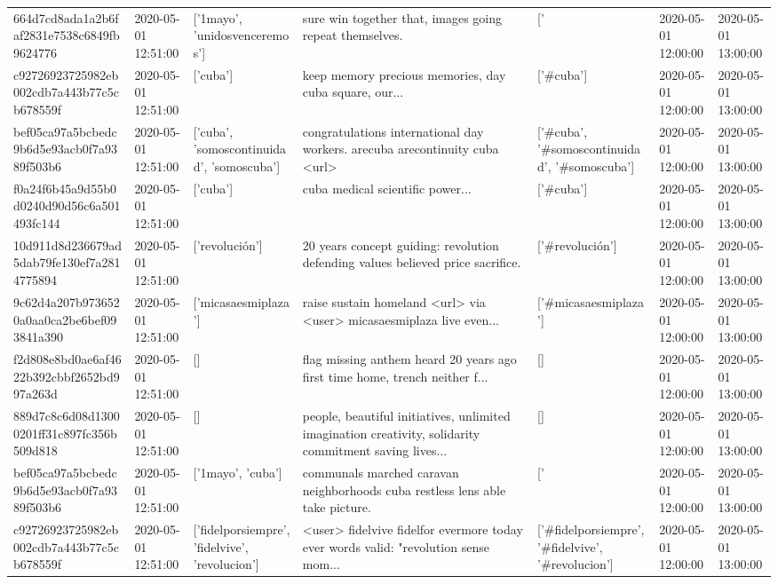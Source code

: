 \begin{tabular}{lllllll}
664d7cd8ada1a2b6faf2831e7538c6849fb9624776 & 2020-05-01 12:51:00 & ['1mayo', 'unidosvenceremos'] & sure win together that, images going repeat themselves. & ['#1mayo', '#unidosvenceremos'] & 2020-05-01 12:00:00 & 2020-05-01 13:00:00 \\
c92726923725982eb002cdb7a443b77c5cb678559f & 2020-05-01 12:51:00 & ['cuba'] & keep memory precious memories, day cuba square, our... & ['#cuba'] & 2020-05-01 12:00:00 & 2020-05-01 13:00:00 \\
bef05ca97a5bcbedc9b6d5e93acb0f7a9389f503b6 & 2020-05-01 12:51:00 & ['cuba', 'somoscontinuidad', 'somoscuba'] & congratulations international day workers. arecuba arecontinuity cuba <url> & ['#cuba', '#somoscontinuidad', '#somoscuba'] & 2020-05-01 12:00:00 & 2020-05-01 13:00:00 \\
f0a24f6b45a9d55b0d0240d90d56c6a501493fc144 & 2020-05-01 12:51:00 & ['cuba'] & cuba medical scientific power... & ['#cuba'] & 2020-05-01 12:00:00 & 2020-05-01 13:00:00 \\
10d911d8d236679ad5dab79fe130ef7a2814775894 & 2020-05-01 12:51:00 & ['revolución'] & 20 years concept guiding: revolution defending values believed price sacrifice. & ['#revolución'] & 2020-05-01 12:00:00 & 2020-05-01 13:00:00 \\
9c62d4a207b9736520a0aa0ca2be6bef093841a390 & 2020-05-01 12:51:00 & ['micasaesmiplaza'] & raise sustain homeland <url> via <user> micasaesmiplaza live even... & ['#micasaesmiplaza'] & 2020-05-01 12:00:00 & 2020-05-01 13:00:00 \\
f2d808e8bd0ae6af4622b392cbbf2652bd997a263d & 2020-05-01 12:51:00 & [] & flag missing anthem heard 20 years ago first time home, trench neither f... & [] & 2020-05-01 12:00:00 & 2020-05-01 13:00:00 \\
889d7c8c6d08d13000201ff31c897fc356b509d818 & 2020-05-01 12:51:00 & [] & people, beautiful initiatives, unlimited imagination creativity, solidarity commitment saving lives... & [] & 2020-05-01 12:00:00 & 2020-05-01 13:00:00 \\
bef05ca97a5bcbedc9b6d5e93acb0f7a9389f503b6 & 2020-05-01 12:51:00 & ['1mayo', 'cuba'] & communals marched caravan neighborhoods cuba restless lens able take picture. & ['#1mayo', '#cuba'] & 2020-05-01 12:00:00 & 2020-05-01 13:00:00 \\
c92726923725982eb002cdb7a443b77c5cb678559f & 2020-05-01 12:51:00 & ['fidelporsiempre', 'fidelvive', 'revolucion'] & <user> fidelvive fidelfor evermore today ever words valid: "revolution sense mom... & ['#fidelporsiempre', '#fidelvive', '#revolucion'] & 2020-05-01 12:00:00 & 2020-05-01 13:00:00 \\

\end{tabular}
